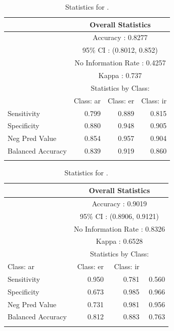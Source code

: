 \begin{table}
  \centering
    \begin{tabular}{lrrr}
      \lsptoprule
      & \multicolumn{3}{c}{Overall Statistics}                \\
      \midrule
      & \multicolumn{3}{c}{Accuracy : 0.8277}                 \\
      & \multicolumn{3}{c}{95\% CI : (0.8012, 0.852)}         \\
      & \multicolumn{3}{c}{No Information Rate : 0.4257}      \\
      & \multicolumn{3}{c}{Kappa : 0.737}                     \\
      \midrule
      & \multicolumn{3}{c}{Statistics by Class:}              \\
      \midrule
   & Class: ar & Class: er & Class: ir \\
      \midrule
      Sensitivity       & 0.799     & 0.889     & 0.815     \\
      Specificity       & 0.880     & 0.948     & 0.905     \\
      Neg Pred Value    & 0.854     & 0.957     & 0.904     \\
      Balanced Accuracy & 0.839     & 0.919     & 0.860     \\
      \lspbottomrule
    \end{tabular}
    \caption{Statistics for .}
    \label{tab:spanish-verbs-theme-v-stats}
\end{table}

\begin{table}
    \begin{tabular}{lrrr}
      \lsptoprule
      &\multicolumn{3}{c}{Overall Statistics}                \\
      \midrule
      & \multicolumn{3}{c}{Accuracy : 0.9019}                 \\
      & \multicolumn{3}{c}{95\% CI : (0.8906, 0.9121)}         \\
      & \multicolumn{3}{c}{No Information Rate : 0.8326}      \\
      & \multicolumn{3}{c}{Kappa : 0.6528}                     \\
      \midrule
      & \multicolumn{3}{c}{Statistics by Class:}              \\
      \midrule
   Class: ar & Class: er & Class: ir \\
      \midrule
      Sensitivity       & 0.950&   0.781&   0.560\\
      Specificity       & 0.673&   0.985&   0.966\\
      Neg Pred Value    & 0.731&   0.981&   0.956\\
      Balanced Accuracy & 0.812&   0.883&   0.763\\
      \lspbottomrule
    \end{tabular}
    \caption{Statistics for .}
    \label{tab:spanish-verbs-theme-v-stats-2}
\end{table}

